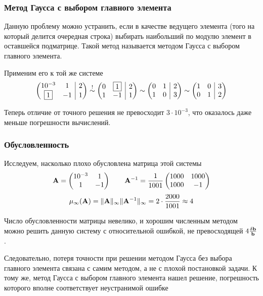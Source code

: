 \documentclass[apectratio=43,unicode]{beamer}
\begin{document}
\begin{frame}\frametitle{Метод Гаусса с выбором главного элемента}
	Данную проблему можно устранить, если в качестве ведущего элемента (того на который делится очередная строка)
	выбирать наибольший по модулю элемент в оставшейся подматрице. Такой метод
	называется методом Гаусса с выбором главного элемента.

	Применим его к той же системе
	\[
	\left(
	\begin{array}{@{}cc|c@{}}
		10^{-3}&1&2\\
		\fbox{1}&-1&1
	\end{array}
	\right)
	\stackrel{!}{\sim}
	\left(
	\begin{array}{@{}cc|c@{}}
		0&\fbox{1}&2\\
		1&-1&1\\
	\end{array}
	\right)
	\sim
	\left(
	\begin{array}{@{}cc|c@{}}
		0&1&2\\
		1&0&3\\
	\end{array}
	\right)
	\sim
	\left(
	\begin{array}{@{}cc|c@{}}
		1&0&3\\
		0&1&2\\
	\end{array}
	\right)
	\]

	Теперь отличие от точного решения не превосходит $3 \cdot 10^{-3}$, что
	оказалось даже меньше погрешности вычислений.
\end{frame}

\begin{frame}\frametitle{Обусловленность}
	Исследуем, насколько плохо обусловлена матрица этой системы
	\[
	\mathbf{A}=\begin{pmatrix}
		10^{-3}&1\\
		1&-1
	\end{pmatrix}
	\qquad
	\mathbf{A}^{-1}=\frac{1}{1001}\begin{pmatrix}
		1000&1000\\
		1000&-1
	\end{pmatrix}
	\]
	\pause
	\[
	\mu_\infty(\mathbf{A}) = \|\mathbf{A}\|_\infty\|\mathbf{A}^{-1}\|_\infty = 2 \cdot \frac{2000}{1001} \approx 4
	\]

	Число обусловленности матрицы невелико, и хорошим численным методом можно решить данную систему с относительной ошибкой,
	не превосходящей $4 \frac{\delta \mathbf{b}}{\mathbf{b}}$.

	Следовательно, потеря точности при решении методом Гаусса без выбора главного элемента связана
	с самим методом, а не с плохой постановкой задачи. К тому же, метод Гаусса с выбором главного
	элемента нашел решение, погрешность которого вполне соответствует неустранимой ошибке
\end{frame}
\end{document}
